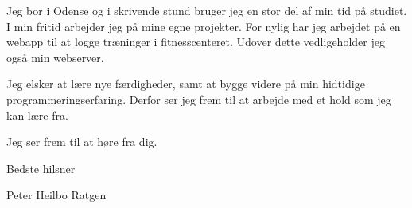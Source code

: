 \documentclass{article}
\begin{document}
Jeg bor i Odense og i skrivende stund bruger jeg en stor del af min tid på
studiet.  I min fritid arbejder jeg på mine egne projekter. For nylig har jeg
arbejdet på en webapp til at logge træninger i fitnesscenteret. Udover dette
vedligeholder jeg også min webserver.
\vspace{\baselineskip}

Jeg elsker at lære nye færdigheder, samt at bygge videre på min hidtidige
programmeringserfaring. Derfor ser jeg frem til at arbejde med et hold som jeg
kan lære fra.

Jeg ser frem til at høre fra dig.  \vspace{\baselineskip}

\begin{flushleft}
Bedste hilsner

\vspace{\baselineskip} Peter Heilbo Ratgen
\end{flushleft}
\end{document}
